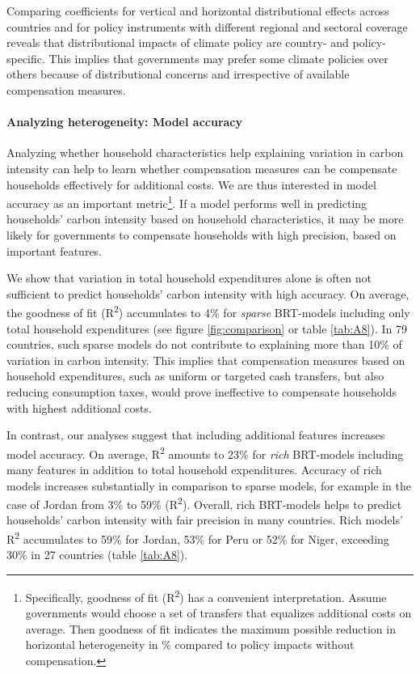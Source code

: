 \documentclass[12pt, a4paper]{article}
\begin{document}
Comparing coefficients for vertical and horizontal distributional effects across countries and for policy instruments with different regional and sectoral coverage reveals that distributional impacts of climate policy are country- and policy-specific. This implies that governments may prefer some climate policies over others because of distributional concerns and irrespective of available compensation measures.

\paragraph{Analyzing heterogeneity: Model accuracy} 
Analyzing whether household characteristics help explaining variation in carbon intensity can help to learn whether compensation measures can be compensate households effectively for additional costs. We are thus interested in model accuracy as an important metric\footnote{Specifically, goodness of fit (R\textsuperscript{2}) has a convenient interpretation. Assume governments would choose a set of transfers that equalizes additional costs on average. Then goodness of fit indicates the maximum possible reduction in horizontal heterogeneity in \% compared to policy impacts without compensation.}. If a model performs well in predicting households' carbon intensity based on household characteristics, it may be more likely for governments to compensate households with high precision, based on important features. 

We show that variation in total household expenditures alone is often not sufficient to predict households' carbon intensity with high accuracy. On average, the goodness of fit (R\textsuperscript{2}) accumulates to 4\% for \textit{sparse} BRT-models including only total household expenditures (see figure \ref{fig:comparison} or table \ref{tab:A8}). In 79 countries, such sparse models do not contribute to explaining more than 10\% of variation in carbon intensity. This implies that compensation measures based on household expenditures, such as uniform or targeted cash transfers, but also reducing consumption taxes, would prove ineffective to compensate households with highest additional costs.

In contrast, our analyses suggest that including additional features increases model accuracy. On average, R\textsuperscript{2} amounts to 23\% for \textit{rich} BRT-models including many features in addition to total household expenditures. Accuracy of rich models increases substantially in comparison to sparse models, for example in the case of Jordan from 3\% to 59\% (R\textsuperscript{2}). Overall, rich BRT-models helps to predict households' carbon intensity with fair precision in many countries. Rich models' R\textsuperscript{2} accumulates to 59\% for Jordan, 53\% for Peru or 52\% for Niger, exceeding 30\% in 27 countries (table \ref{tab:A8}).
\end{document}
